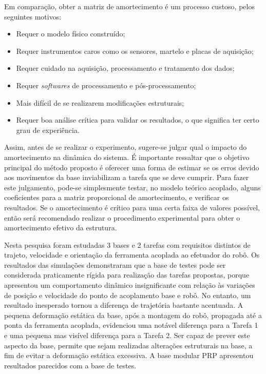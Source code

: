 Em comparação, obter a matriz de amortecimento é um processo custoso, pelos
seguintes motivos:
%
\begin{itemize}
  \item Requer o modelo físico construído;
  \item Requer instrumentos caros como os sensores, martelo e placas de
  aquisição;
  \item Requer cuidado na aquisição, processamento e tratamento dos dados;
  \item Requer \textit{softwares} de processamento e pós-processamento;
  \item Mais difícil de se realizarem modificações estruturais;
  \item Requer boa análise crítica para validar os resultados, o que significa
  ter certo grau de experiência.
\end{itemize}
%

Assim, antes de se realizar o experimento, sugere-se julgar qual o impacto do
amortecimento na dinâmica do sistema. É importante ressaltar que o objetivo
principal do método proposto é oferecer uma forma de estimar se os erros devido
aos movimentos da base inviabilizam a tarefa que se deve cumprir. Para fazer
este julgamento, pode-se simplesmente testar, no modelo teórico acoplado, alguns
coeficientes para a matriz proporcional de amortecimento, e verificar os
resultados. Se o amortecimento é crítico para uma certa faixa de valores
possível, então será recomendado realizar o procedimento experimental para obter
o amortecimento efetivo da estrutura.




Nesta pesquisa foram estudadas 3 bases e 2 tarefas com requisitos distintos de
trajeto, velocidade e orientação da ferramenta acoplada ao efetuador do robô. Os
resultados das simulações demonstraram que a base de testes pode ser considerada
praticamente rígida para realização das tarefas propostas, porque apresentou um
comportamento dinâmico insignificante com relação às variações de posição e
velocidade do ponto de acoplamento base e robô. No entanto, um resultado
inesperado tornou a diferença de trajetória bastante acentuada. A pequena
deformação estática da base, após a montagem do robô, propagada até a ponta da
ferramenta acoplada, evidenciou uma notável diferença para a Tarefa 1 e uma
pequena mas visível diferença para a Tarefa 2. Ser capaz de prever este aspecto
da base, permite que sejam realizadas alterações estruturais na base, a fim de
evitar a deformação estática excessiva. A base modular PRP apresentou resultados
parecidos com a base de testes.

